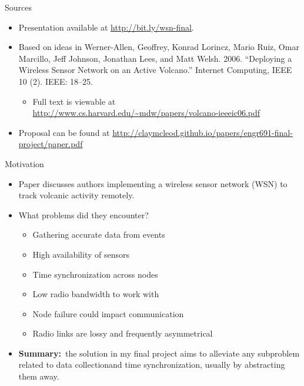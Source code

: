 
\begin{frame}[t,plain]
\titlepage
\end{frame}

\begin{frame}[t]{Sources}
\begin{itemize}
\item Presentation available at \url{http://bit.ly/wsn-final}.
\item Based on ideas in Werner-Allen, Geoffrey, Konrad Lorincz, Mario Ruiz, Omar Marcillo, Jeff Johnson, Jonathan Lees, and Matt Welsh. 2006. “Deploying a Wireless Sensor Network on an Active Volcano.” Internet Computing, IEEE 10 (2). IEEE: 18–25.
\begin{itemize}
\item Full text is viewable at \url{http://www.cs.harvard.edu/~mdw/papers/volcano-ieeeic06.pdf}
\end{itemize}
\item Proposal can be found at \url{http://claymcleod.github.io/papers/engr691-final-project/paper.pdf}
\end{itemize}
\end{frame}

\begin{frame}[t,fragile]{Motivation}
\begin{itemize}
\item<1-> Paper discusses authors implementing a wireless sensor network (WSN) to track volcanic activity remotely.
\item<2-> What problems did they encounter?
\begin{itemize}
\item<3-> Gathering accurate data from events \only<5>{\color{red}{X}}
\item<3-> High availability of sensors 
\item<3-> Time synchronization across nodes 
\item<3-> Low radio bandwidth to work with 
\item<3-> Node failure could impact communication 
\item<3-> Radio links are lossy and frequently asymmetrical 
\end{itemize}
\item<4-> \textbf{Summary:}~the solution in my final project aims to alleviate any subproblem related to data collectionand time synchronization, usually by abstracting them away.
\end{itemize}
\end{frame}

